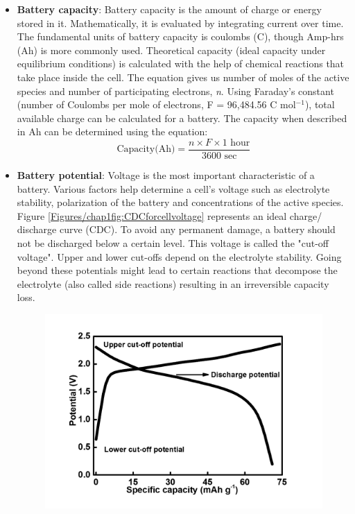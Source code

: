 \begin{itemize}
\item \textbf{Battery capacity}: Battery capacity is the amount of charge or energy stored in it. Mathematically, it is evaluated by integrating current over time. The fundamental units of battery capacity is coulombs (C), though Amp-hrs (Ah) is more commonly used.  Theoretical capacity (ideal capacity under equilibrium conditions) is calculated with the help of chemical reactions that take place inside the cell. The equation gives us number of moles of the active species and number of participating electrons, \textit{n}. Using Faraday’s constant (number of Coulombs per mole of electrons, F = 96,484.56 C mol$^{-1}$), total available charge can be calculated for a battery. The capacity when described in Ah can be determined using the equation:
\begin{equation} \label{eq1}
  \text{Capacity(Ah)}=\frac{n \times F \times 1 \text{ hour}}{3600 \text{ sec}}
\end{equation}
\item \textbf{Battery potential}: Voltage is the  most important characteristic of a battery. Various factors help determine a cell's voltage such as electrolyte stability, polarization of the battery and concentrations of the active species. Figure \ref{Figures/chap1fig:CDCforcellvoltage} represents an ideal charge/ discharge curve (CDC). To avoid any permanent damage, a battery should not be discharged below a certain level. This voltage is called the "cut-off voltage". Upper and lower cut-offs depend on the electrolyte stability. Going beyond these potentials might lead to certain reactions that decompose the electrolyte (also called side reactions) resulting in an irreversible capacity loss. 
\begin{figure}[tbh!]
\centering
\includegraphics[width=\textwidth]{Figures/chap1fig/CDCforcellvoltage}

\end{figure}
\end{itemize}
